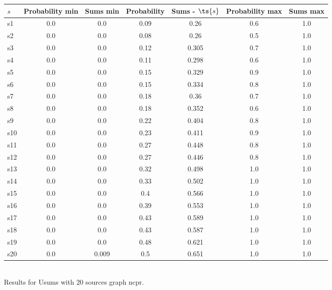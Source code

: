 \documentclass{article}
\begin{document}
\noindent\begin{tabular}{|l|c|c|c|c|c|c|}
\hline
$s$& Probability min & Sums min & Probability & Sums - $\ts{s}$ & Probability max & Sums max\\
\hline
s1 &0.0 & 0.0 & 0.09 & 0.26 & 0.6 & 1.0\\
\hline
s2 &0.0 & 0.0 & 0.08 & 0.26 & 0.5 & 1.0\\
\hline
s3 &0.0 & 0.0 & 0.12 & 0.305 & 0.7 & 1.0\\
\hline
s4 &0.0 & 0.0 & 0.11 & 0.298 & 0.6 & 1.0\\
\hline
s5 &0.0 & 0.0 & 0.15 & 0.329 & 0.9 & 1.0\\
\hline
s6 &0.0 & 0.0 & 0.15 & 0.334 & 0.8 & 1.0\\
\hline
s7 &0.0 & 0.0 & 0.18 & 0.36 & 0.7 & 1.0\\
\hline
s8 &0.0 & 0.0 & 0.18 & 0.352 & 0.6 & 1.0\\
\hline
s9 &0.0 & 0.0 & 0.22 & 0.404 & 0.8 & 1.0\\
\hline
s10 &0.0 & 0.0 & 0.23 & 0.411 & 0.9 & 1.0\\
\hline
s11 &0.0 & 0.0 & 0.27 & 0.448 & 0.8 & 1.0\\
\hline
s12 &0.0 & 0.0 & 0.27 & 0.446 & 0.8 & 1.0\\
\hline
s13 &0.0 & 0.0 & 0.32 & 0.498 & 1.0 & 1.0\\
\hline
s14 &0.0 & 0.0 & 0.33 & 0.502 & 1.0 & 1.0\\
\hline
s15 &0.0 & 0.0 & 0.4 & 0.566 & 1.0 & 1.0\\
\hline
s16 &0.0 & 0.0 & 0.39 & 0.553 & 1.0 & 1.0\\
\hline
s17 &0.0 & 0.0 & 0.43 & 0.589 & 1.0 & 1.0\\
\hline
s18 &0.0 & 0.0 & 0.43 & 0.587 & 1.0 & 1.0\\
\hline
s19 &0.0 & 0.0 & 0.48 & 0.621 & 1.0 & 1.0\\
\hline
s20 &0.0 & 0.009 & 0.5 & 0.651 & 1.0 & 1.0\\
\hline
\end{tabular}\\

\noindent Results for Usums with 20 sources graph ncpr.
\end{document}
